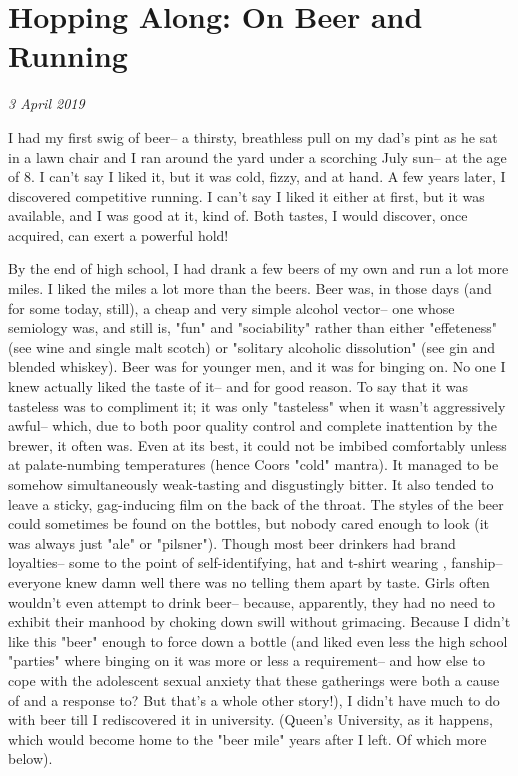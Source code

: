 \chapter{Hopping Along: On Beer and Running}
\textit{3 April 2019}
\bigskip

I had my first swig of beer-- a thirsty, breathless pull on my dad's pint as he sat in a lawn chair and I ran around the yard under a scorching July sun-- at the age of 8. I can't say I liked it, but it was cold, fizzy, and at hand. A few years later, I discovered competitive running. I can't say I liked it either at first, but it was available, and I was good at it, kind of. Both tastes, I would discover, once acquired, can exert a powerful hold!

By the end of high school, I had drank a few beers of my own and run a lot more miles. I liked the miles a lot more than the beers. Beer was, in those days (and for some today, still), a cheap and very simple alcohol vector-- one whose semiology was, and still is, "fun" and "sociability" rather than either "effeteness" (see wine and single malt scotch) or "solitary alcoholic dissolution" (see gin and blended whiskey). Beer was for younger men, and it was for binging on. No one I knew actually liked the taste of it-- and for good reason. To say that it was tasteless was to compliment it; it was only "tasteless" when it wasn't aggressively awful-- which, due to both poor quality control and complete inattention by the brewer, it often was. Even at its best, it could not be imbibed comfortably unless at palate-numbing temperatures (hence Coors "cold" mantra). It managed to be somehow simultaneously weak-tasting and disgustingly bitter. It also tended to leave a sticky, gag-inducing film on the back of the throat. The styles of the beer could sometimes be found on the bottles, but nobody cared enough to look (it was always just "ale" or "pilsner"). Though most beer drinkers had brand loyalties-- some to the point of self-identifying, hat and t-shirt wearing , fanship-- everyone knew damn well there was no telling them apart by taste. Girls often wouldn't even attempt to drink beer-- because, apparently, they had no need to exhibit their manhood by choking down swill without grimacing. Because I didn't like this "beer" enough to force down a bottle (and liked even less the high school "parties" where binging on it was more or less a requirement-- and how else to cope with the adolescent sexual anxiety that these gatherings were both a cause of and a response to? But that's a whole other story!), I didn't have much to do with beer till I rediscovered it in university. (Queen's University, as it happens, which would become home to the "beer mile" years after I left. Of which more below).


